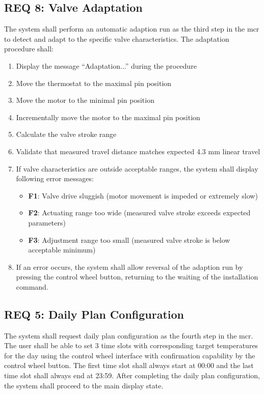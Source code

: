 \subsection*{REQ 8: Valve Adaptation}
\label{subsec:REQ 8: Valve Adaptation}
The system shall perform an automatic adaption run as the third step in the \acs{mcr} to detect and adapt to the specific valve characteristics. The adaptation procedure shall:
\begin{enumerate}
    \item Display the message ``Adaptation...'' during the procedure
    \item Move the thermostat to the maximal pin position
    \item Move the motor to the minimal pin position
    \item Incrementally move the motor to the maximal pin position
    \item Calculate the valve stroke range
    \item Validate that measured travel distance matches expected 4.3 mm linear travel
    \item If valve characteristics are outside acceptable ranges, the system shall display following error messages:
    \begin{itemize}
        \item \textbf{F1}: Valve drive sluggish (motor movement is impeded or extremely slow)
        \item \textbf{F2}: Actuating range too wide (measured valve stroke exceeds expected parameters)
        \item \textbf{F3}: Adjustment range too small (measured valve stroke is below acceptable minimum)
    \end{itemize}
    \item If an error occurs, the system shall allow reversal of the adaption run by pressing the control wheel button, returning to the waiting of the installation command.
\end{enumerate}

\subsection*{REQ 5: Daily Plan Configuration}
\label{subsec:REQ 5: Daily Plan Configuration}
The system shall request daily plan configuration as the fourth step in the \acs{mcr}. The user shall be able to set 3 time slots with corresponding target temperatures for the day using the control wheel interface with confirmation capability by the control wheel button. The first time slot shall always start at 00:00 and the last time slot shall always end at 23:59. After completing the daily plan configuration, the system shall proceed to the main display state.

